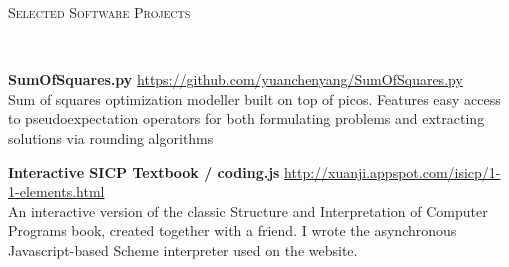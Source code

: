 \documentclass[9pt]{article}
\newenvironment{changemargin}[2]{%
  \begin{list}{}{%
      \setlength{\topsep}{0pt}%
      \setlength{\leftmargin}{#1}%
      \setlength{\rightmargin}{#2}%
      \setlength{\listparindent}{\parindent}%
      \setlength{\itemindent}{\parindent}%
      \setlength{\parsep}{\parskip}%
    }%
  \item[]}{\end{list}
}
\newcommand{\lineover}{
  \begin{changemargin}{-0.05in}{-0.05in}
    \vspace*{-8pt}
    \hrulefill \\
    \vspace*{-2pt}
  \end{changemargin}
}
\newcommand{\header}[1]{
  \begin{changemargin}{-0.5in}{-0.5in}
    \scshape{#1}\\
    \lineover
  \end{changemargin}
}
\newenvironment{body} {
  \vspace*{-16pt}
  \begin{changemargin}{-0.25in}{-0.5in}
  }
  {\end{changemargin}
}
\begin{document}
\header{Selected Software Projects}
\begin{body}
  \vspace{14pt}
  \textbf{SumOfSquares.py} \hfill \url{https://github.com/yuanchenyang/SumOfSquares.py} \\
  Sum of squares optimization modeller built on top of picos. Features easy
  access to pseudoexpectation operators for both formulating problems and
  extracting solutions via rounding algorithms
  \smallskip

%

  \textbf{Interactive SICP Textbook / coding.js} \hfill
  \url{http://xuanji.appspot.com/isicp/1-1-elements.html}\\
  An interactive version of the classic Structure and Interpretation of Computer
  Programs book, created together with a friend. I wrote the asynchronous
  Javascript-based Scheme interpreter used on the website. \\
\end{body}

\smallskip

\end{document}
